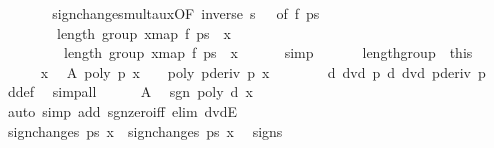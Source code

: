 \begin{isabellebody}
\ \ \ \ \isamarkupfalse%
\ \isamarkupfalse%
\ sign{\isacharunderscore}changes{\isacharunderscore}mult{\isacharunderscore}aux{\isacharbrackleft}OF\ {\isacharbackquoteopen}inverse\ s\ {\isasymnoteq}\ {}{\isacharbackquoteclose}{\isacharcomma}\ of\ f\ ps{\isacharbrackright}\isanewline
\ \ \ \ \isamarkupfalse%
\ \isamarkupfalse%
\ \isanewline
\ \ \ \ \ \ \ \ {\isachardoublequoteopen}length\ {\isacharparenleft}group\ {\isacharbrackleft}x{\isasymleftarrow}map\ f\ ps{\isacharprime}\ {\isachardot}\ x\ {\isasymnoteq}\ {}{\isacharbrackright}{\isacharparenright}\ {\isacharminus}\ {}\ {\isacharequal}\isanewline
\ \ \ \ \ \ \ \ \ length\ {\isacharparenleft}group\ {\isacharbrackleft}x{\isasymleftarrow}map\ f\ ps\ {\isachardot}\ x\ {\isasymnoteq}\ {}{\isacharbrackright}{\isacharparenright}\ {\isacharminus}\ {}{\isachardoublequoteclose}\ \isamarkupfalse%
\ simp\isanewline
\ \ \isacommand{{\isacharbraceright}}\isamarkupfalse%
\isanewline
\ \ \isamarkupfalse%
\ length{\isacharunderscore}group\ {\isacharequal}\ this\isanewline
\isanewline
\ \ \isacommand{{\isacharbraceleft}}\isamarkupfalse%
\isanewline
\ \ \ \ \isamarkupfalse%
\ x\ \isamarkupfalse%
\ A{\isacharcolon}\ {\isachardoublequoteopen}poly\ p\ x\ {\isasymnoteq}\ {}\ {\isasymor}\ poly\ {\isacharparenleft}pderiv\ p{\isacharparenright}\ x\ {\isasymnoteq}\ {}{\isachardoublequoteclose}\isanewline
\ \ \ \ \isamarkupfalse%
\ {\isachardoublequoteopen}d\ dvd\ p{\isachardoublequoteclose}\ {\isachardoublequoteopen}d\ dvd\ pderiv\ p{\isachardoublequoteclose}\ \isamarkupfalse%
\ d{\isacharunderscore}def\ \isamarkupfalse%
\ simp{\isacharunderscore}all\isanewline
\ \ \ \ \isamarkupfalse%
\ A\ \isamarkupfalse%
\ {\isachardoublequoteopen}sgn\ {\isacharparenleft}poly\ d\ x{\isacharparenright}\ {\isasymnoteq}\ {}{\isachardoublequoteclose}\ \isanewline
\ \ \ \ \ \ \ \ \isamarkupfalse%
\ {\isacharparenleft}auto\ simp\ add{\isacharcolon}\ sgn{\isacharunderscore}zero{\isacharunderscore}iff\ elim{\isacharcolon}\ dvdE{\isacharparenright}\ \isanewline
\ \ \ \ \isamarkupfalse%
\ {\isachardoublequoteopen}sign{\isacharunderscore}changes\ ps{\isacharprime}\ x\ {\isacharequal}\ sign{\isacharunderscore}changes\ ps\ x{\isachardoublequoteclose}\ \isamarkupfalse%
\ signs{\isacharparenleft}{}{\isacharparenright}\isanewline

\end{isabellebody}
